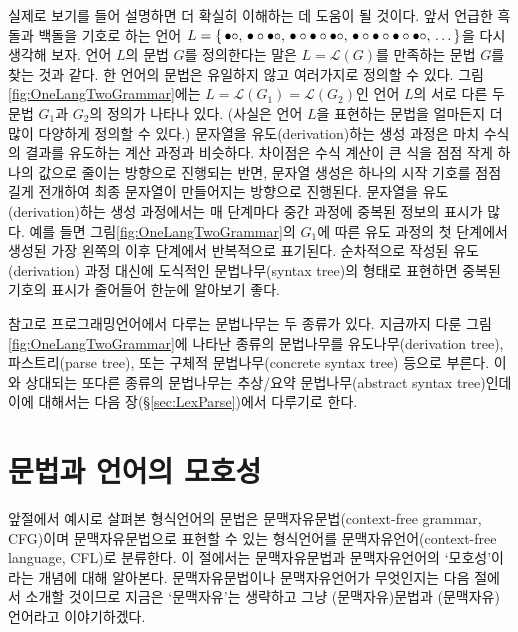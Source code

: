 실제로 보기를 들어 설명하면 더 확실히 이해하는 데 도움이 될 것이다.
앞서 언급한 흑돌과 백돌을 기호로 하는 언어 
$L = \{\, \bullet\circ
      ,\, \bullet\circ\bullet\circ
      ,\, \bullet\circ\bullet\circ\bullet\circ
      ,\, \bullet\circ\bullet\circ\bullet\circ\bullet\circ
      ,\, \ldots
   \,\}$을 다시 생각해 보자.
언어 $L$의 문법 $G$를 정의한다는 말은 $L = \mathcal{L}(G)$를 만족하는 문법 $G$를 찾는
것과 같다. 한 언어의 문법은 유일하지 않고 여러가지로 정의할 수 있다.
그림\;\ref{fig:OneLangTwoGrammar}에는 $L = \mathcal{L}(G_1) = \mathcal{L}(G_2)$인
언어 $L$의 서로 다른 두 문법 $G_1$과 $G_2$의 정의가 나타나 있다. (사실은
언어 $L$을 표현하는 문법을 얼마든지 더 많이 다양하게 정의할 수 있다.)
문자열을 유도(derivation)하는 생성 과정은 마치 수식의 결과를 유도하는
계산 과정과 비슷하다. 차이점은 수식 계산이 큰 식을 점점 작게 하나의 값으로
줄이는 방향으로 진행되는 반면, 문자열 생성은 하나의 시작 기호를 점점 길게
전개하여 최종 문자열이 만들어지는 방향으로 진행된다. 문자열을 유도(derivation)하는
생성 과정에서는 매 단계마다 중간 과정에 중복된 정보의 표시가 많다. 예를 들면
그림\;\ref{fig:OneLangTwoGrammar}의 $G_1$에 따른 유도 과정의 첫 단계에서
생성된 가장 왼쪽의  이후 단계에서 반복적으로 표기된다.
순차적으로 작성된 유도(derivation) 과정 대신에 도식적인 문법나무(syntax tree)의
형태로 표현하면 중복된 기호의 표시가 줄어들어 한눈에 알아보기 좋다.

참고로 프로그래밍언어에서 다루는 문법나무는 두 종류가 있다.
지금까지 다룬 그림\;\ref{fig:OneLangTwoGrammar}에 나타난 종류의 문법나무를
유도나무(derivation tree), 파스트리(parse tree), 또는
구체적 문법나무(concrete syntax tree) 등으로 부른다.
이와 상대되는 또다른 종류의 문법나무는
추상/요약 문법나무(abstract syntax tree)인데
이에 대해서는 다음 장(\S\ref{sec:LexParse})에서 다루기로 한다.

\section{문법과 언어의 모호성}
\label{sec:ambiguous}
앞절에서 예시로 살펴본 형식언어의 문법은 문맥자유문법(context-free grammar, CFG)이며
문맥자유문법으로 표현할 수 있는 형식언어를 문맥자유언어(context-free language, CFL)로
분류한다. 이 절에서는 문맥자유문법과 문맥자유언어의 `모호성'이라는 개념에 대해 알아본다.
문맥자유문법이나 문맥자유언어가 무엇인지는 다음 절에서 소개할 것이므로
지금은 `문맥자유'는 생략하고 그냥 (문맥자유)문법과 (문맥자유)언어라고 이야기하겠다.

